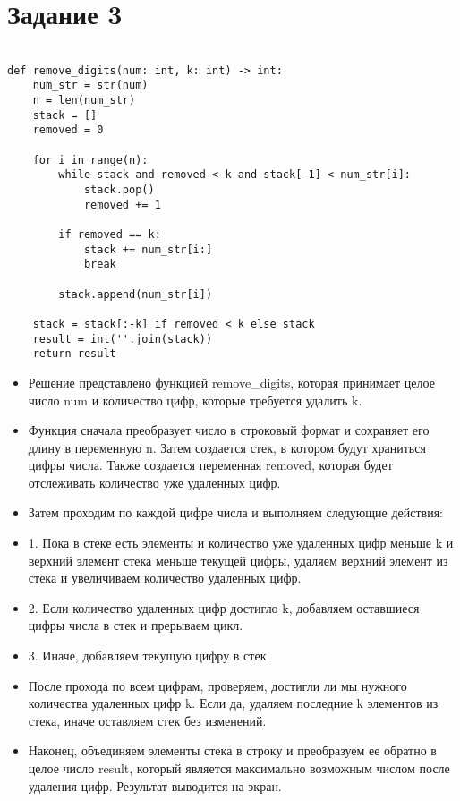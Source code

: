 
\section*{Задание 3}

\begin{lstlisting}

def remove_digits(num: int, k: int) -> int:
    num_str = str(num)
    n = len(num_str)
    stack = []
    removed = 0

    for i in range(n):
        while stack and removed < k and stack[-1] < num_str[i]:
            stack.pop()
            removed += 1

        if removed == k:
            stack += num_str[i:]
            break

        stack.append(num_str[i])

    stack = stack[:-k] if removed < k else stack
    result = int(''.join(stack))
    return result
\end{lstlisting}

\begin{itemize}

\item  Решение представлено функцией remove\_digits, которая принимает целое число num и количество цифр, которые требуется удалить k. 

\item Функция сначала преобразует число в строковый формат и сохраняет его длину в переменную n. Затем создается стек, в котором будут храниться цифры числа. Также создается переменная removed, которая будет отслеживать количество уже удаленных цифр. 

\item Затем проходим по каждой цифре числа и выполняем следующие действия:
\item	 1. Пока в стеке есть элементы и количество уже удаленных цифр меньше k и верхний элемент стека меньше текущей цифры, удаляем верхний элемент из стека и увеличиваем количество удаленных цифр.
\item	 2. Если количество удаленных цифр достигло k, добавляем оставшиеся цифры числа в стек и прерываем цикл.
\item	 3. Иначе, добавляем текущую цифру в стек.

\item После прохода по всем цифрам, проверяем, достигли ли мы нужного количества удаленных цифр k. Если да, удаляем последние k элементов из стека, иначе оставляем стек без изменений. 

\item Наконец, объединяем элементы стека в строку и преобразуем ее обратно в целое число result, который является максимально возможным числом после удаления цифр. Результат выводится на экран.
 
\end{itemize}